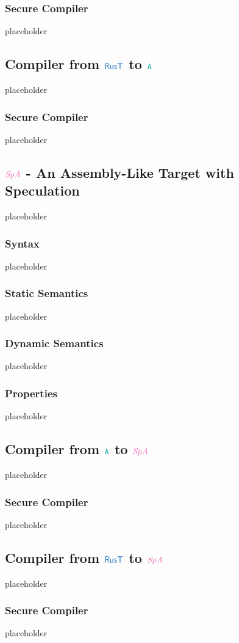 \documentclass[a4paper,12pt]{article}
\begin{document}
\subsubsection{Secure Compiler}\label{subsec-cepees-to-a-seccomp}
placeholder

\subsection{Compiler from $\src{RusT}$ to $\obj{A}$}\label{subsec-rust-to-a}
placeholder
\subsubsection{Secure Compiler}\label{subsec-rust-to-a-seccomp}
placeholder


\subsection{$\ird{SpA}$ - An Assembly-Like Target with Speculation}\label{subsec-spa}
placeholder
\subsubsection{Syntax}\label{subsec-spa-syntax}
placeholder
\subsubsection{Static Semantics}\label{subsec-spa-static}
placeholder
\subsubsection{Dynamic Semantics}\label{subsec-spa-dynamic}
placeholder
\subsubsection{Properties}\label{subsec-spa-properties}
placeholder


\subsection{Compiler from $\obj{A}$ to $\ird{SpA}$}\label{subsec-a-to-spa}
placeholder
\subsubsection{Secure Compiler}\label{subsec-a-to-spa-seccomp}
placeholder

\subsection{Compiler from $\src{RusT}$ to $\ird{SpA}$}\label{subsec-rust-to-spa}
placeholder
\subsubsection{Secure Compiler}\label{subsec-rust-to-spa-seccomp}
placeholder


\clearpage



\printglossary
\end{document}
